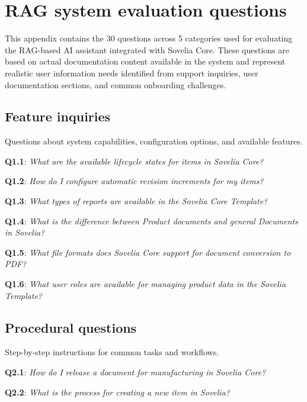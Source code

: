 %
%
%

\chapter{RAG system evaluation questions}
\label{app:evaluation-questions}

This appendix contains the 30 questions across 5 categories used for evaluating the RAG-based AI assistant integrated with Sovelia Core. These questions are based on actual documentation content available in the system and represent realistic user information needs identified from support inquiries, user documentation sections, and common onboarding challenges.

\section{Feature inquiries}
\label{app:category-feature-inquiries}

Questions about system capabilities, configuration options, and available features.

\textbf{Q1.1}: \textit{What are the available lifecycle states for items in Sovelia Core?}

\textbf{Q1.2}: \textit{How do I configure automatic revision increments for my items?}

\textbf{Q1.3}: \textit{What types of reports are available in the Sovelia Core Template?}

\textbf{Q1.4}: \textit{What is the difference between Product documents and general Documents in Sovelia?}

\textbf{Q1.5}: \textit{What file formats does Sovelia Core support for document conversion to PDF?}

\textbf{Q1.6}: \textit{What user roles are available for managing product data in the Sovelia Template?}

\section{Procedural questions}
\label{app:category-procedural-questions}

Step-by-step instructions for common tasks and workflows.

\textbf{Q2.1}: \textit{How do I release a document for manufacturing in Sovelia Core?}

\textbf{Q2.2}: \textit{What is the process for creating a new item in Sovelia?}

